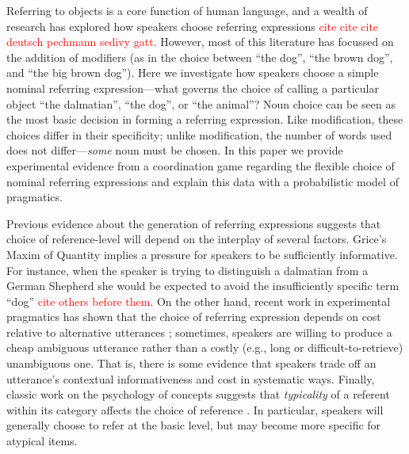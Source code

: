 \documentclass[10pt,letterpaper]{article}
\newcommand{\red}[1]{\textcolor{Red}{#1}}
\begin{document}
Referring to objects is a core function of human language, and a wealth of research has explored how speakers choose referring expressions \red{cite cite cite deutsch pechmann sedivy gatt}. 
However, most of this literature has focussed on the addition of modifiers (as in the choice between ``the dog'', ``the brown dog'', and ``the big brown dog''). Here we investigate how speakers choose a simple nominal referring expression---what governs the choice of calling a particular object ``the dalmatian'', ``the dog'', or ``the animal''? 
Noun choice can be seen as the most basic decision in forming a referring expression.
Like modification, these choices differ in their specificity; unlike modification, the number of words used does not differ---\emph{some} noun must be chosen.
In this paper we provide experimental evidence from a coordination game regarding the flexible choice of nominal referring expressions and explain this data with a probabilistic model of pragmatics.



Previous evidence about the generation of referring expressions suggests that choice of reference-level will depend on the interplay of several factors. 
Grice's Maxim of Quantity \cite{grice1975} implies a pressure for speakers to be sufficiently informative.
For instance, when the speaker is trying to distinguish a dalmatian from a German Shepherd she would be expected to avoid the insufficiently specific term ``dog'' \cite{brennan1996} \red{cite others before them}.
On the other hand, recent work in experimental pragmatics has shown that the choice of referring expression depends on cost relative to alternative utterances \cite{rohde2012, degenfrankejaeger2013}; sometimes, speakers are willing to produce a cheap ambiguous utterance rather than a costly (e.g., long or difficult-to-retrieve) unambiguous one. That is, there is some evidence that speakers trade off an utterance's contextual informativeness and cost in systematic ways.
Finally, classic work on the psychology of concepts suggests that \emph{typicality} of a referent within its category affects the choice of reference \cite{RoschEtAl76_BasicLevel}. In particular, speakers will generally choose to refer at the basic level, but may become more specific for atypical items.
\end{document}
